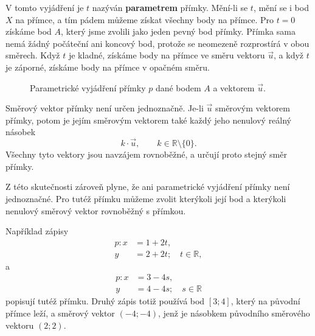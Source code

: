 V tomto vyjádření je $t$ nazýván \textbf{parametrem} přímky.
Mění-li se $t$, mění se i bod $X$ na přímce, a tím pádem můžeme získat všechny body na přímce.
Pro $t=0$ získáme bod $A$, který jsme zvolili jako jeden pevný bod přímky.
Přímka sama nemá žádný počáteční ani koncový bod, protože se neomezeně
rozprostírá v obou směrech.
Když $t$ je kladné, získáme body na přímce ve směru vektoru $\vec{u}$, a když $t$ je záporné, získáme body na přímce v opačném směru.

\begin{figure}[H]
    \centering
    \caption{Parametrické vyjádření přímky $p$ dané bodem $A$ a vektorem $\vec{u}$.}
    \label{fig:Parametric_line}
\end{figure}

\begin{remark}
    Směrový vektor přímky není určen jednoznačně. Je-li $\vec{u}$
    směrovým vektorem přímky, potom je jejím směrovým vektorem také
    každý jeho nenulový reálný násobek
    \[
        k\cdot\vec{u},\qquad k\in\mathbb{R}\setminus\{0\}.
    \]
    Všechny tyto vektory jsou navzájem rovnoběžné, a určují proto
    stejný směr přímky.
\end{remark}

Z této skutečnosti zároveň plyne, že ani parametrické vyjádření přímky
není jednoznačné. Pro tutéž přímku můžeme zvolit kterýkoli její bod
a kterýkoli nenulový směrový vektor rovnoběžný s přímkou.

Například zápisy
\begin{align*}
    p: x &= 1+2t,\\
       y &= 2+2t;\quad t\in\mathbb{R},
\end{align*}
a
\begin{align*}
    p: x &= 3-4s,\\
       y &= 4-4s;\quad s\in\mathbb{R}
\end{align*}
popisují tutéž přímku. Druhý zápis totiž používá bod $[3;4]$, který
na původní přímce leží, a směrový vektor $(-4;-4)$, jenž je násobkem
původního směrového vektoru $(2;2)$.

